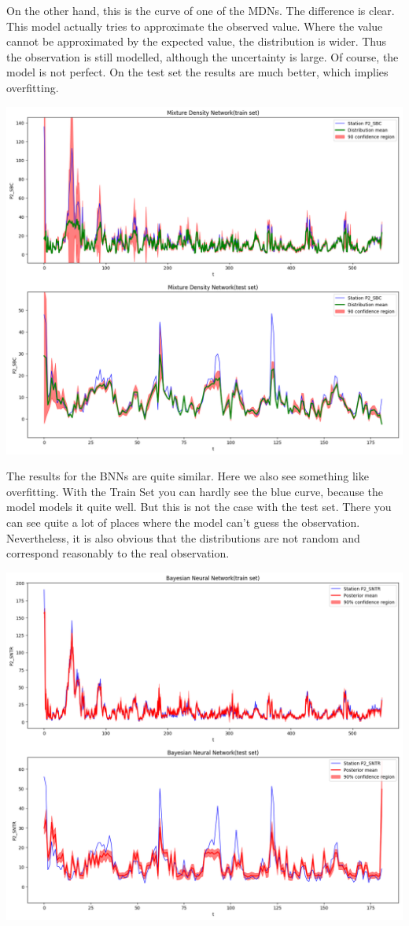 \documentclass[margin=0.01in]{article}
\begin{document}
On the other hand, this is the curve of one of the MDNs. The difference is clear. This model actually tries to approximate the observed value. Where the value cannot be approximated by the expected value, the distribution is wider. Thus the observation is still modelled, although the uncertainty is large. Of course, the model is not perfect. On the test set the results are much better, which implies overfitting.

\begin{center}
\includegraphics[width=.9\linewidth]{../images/12h/mdn_12h.png}
\end{center}

The results for the BNNs are quite similar. Here we also see something like overfitting. With the Train Set you can hardly see the blue curve, because the model models it quite well. But this is not the case with the test set. There you can see quite a lot of places where the model can't guess the observation. Nevertheless, it is also obvious that the distributions are not random and correspond reasonably to the real observation.

\begin{center}
\includegraphics[width=.9\linewidth]{../images/12h/bnn_12h.png}
\end{center}
\end{document}

